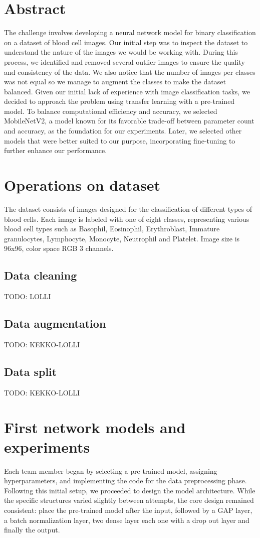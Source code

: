 \documentclass[11pt]{article}
\begin{document}
\section{Abstract}
The challenge involves developing a neural network model for binary classification on a dataset of blood cell images. Our initial step was to inspect the dataset to understand the nature of the images we would be working with. During this process, we identified and removed several outlier images to ensure the quality and consistency of the data. We also notice that the number of images per classes was not equal so we manage to augment the classes to make the dataset balanced. Given our initial lack of experience with image classification tasks, we decided to approach the problem using transfer learning with a pre-trained model. To balance computational efficiency and accuracy, we selected MobileNetV2, a model known for its favorable trade-off between parameter count and accuracy, as the foundation for our experiments. Later, we selected other models that were better suited to our purpose, incorporating fine-tuning to further enhance our performance.

\section{Operations on dataset}
The dataset consists of images designed for the classification of different types of blood cells. Each image is labeled with one of eight classes, representing various blood cell types such as Basophil, Eosinophil, Erythroblast,  Immature granulocytes, Lymphocyte, Monocyte, Neutrophil and Platelet. Image size is 96x96, color space RGB 3 channels.
\subsection{Data cleaning}
TODO: LOLLI
\subsection{Data augmentation}
TODO: KEKKO-LOLLI
\subsection{Data split}
TODO: KEKKO-LOLLI

\section{First network models and experiments}
Each team member began by selecting a pre-trained model, assigning hyperparameters, and implementing the code for the data preprocessing phase. Following this initial setup, we proceeded to design the model architecture. While the specific structures varied slightly between attempts, the core design remained consistent: place the pre-trained model after the input, followed by a GAP layer, a batch normalization layer, two dense layer each one with a drop out layer and finally the output.
\end{document}
